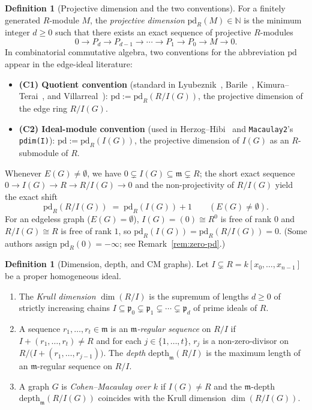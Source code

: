 \documentclass[11pt,a4paper]{amsart}
\theoremstyle{plain}
\theoremstyle{definition}
\newtheorem{definition}[theorem]{Definition}
\newcommand{\pd}{\mathrm{pd}}
\newcommand{\depth}{\mathrm{depth}}
\newcommand{\mm}{\mathfrak{m}}
\newcommand{\pp}{\mathfrak{p}}
\begin{document}
\begin{definition}[Projective dimension and the two conventions]
For a finitely generated $R$-module $M$, the \emph{projective dimension} $\pd_R(M) \in \mathbb{N}$ is the minimum integer $d \ge 0$ such that there exists an exact sequence of projective $R$-modules
\[
  0 \longrightarrow P_d \longrightarrow P_{d-1} \longrightarrow \cdots \longrightarrow P_1 \longrightarrow P_0 \longrightarrow M \longrightarrow 0.
\]
In combinatorial commutative algebra, two conventions for the abbreviation $\pd$ appear in the edge-ideal literature:
\begin{itemize}
  \item \textbf{(C1) Quotient convention} (standard in Lyubeznik~\cite{Lyubeznik1988}, Barile~\cite{Barile2008}, Kimura--Terai~\cite{KimuraTerai2009}, and Villarreal~\cite{Villarreal2015}): $\pd := \pd_R(R/I(G))$, the projective dimension of the edge ring $R/I(G)$.
  \item \textbf{(C2) Ideal-module convention} (used in Herzog--Hibi~\cite{HerzogHibi2011} and \texttt{Macaulay2}'s \texttt{pdim(I)}): $\pd := \pd_R(I(G))$, the projective dimension of $I(G)$ as an $R$-submodule of $R$.
\end{itemize}
Whenever $E(G) \neq \emptyset$, we have $0 \subsetneq I(G) \subseteq \mm \subsetneq R$; the short exact sequence $0 \to I(G) \to R \to R/I(G) \to 0$ and the non-projectivity of $R/I(G)$ yield the exact shift
\begin{equation}\label{eq:pd-shift}
  \pd_R(R/I(G)) \;=\; \pd_R(I(G)) + 1 \qquad (E(G) \neq \emptyset).
\end{equation}
For an edgeless graph ($E(G) = \emptyset$), $I(G) = (0) \cong R^0$ is free of rank $0$ and $R/I(G) \cong R$ is free of rank $1$, so $\pd_R(I(G)) = \pd_R(R/I(G)) = 0$. (Some authors assign $\pd_R(0) = -\infty$; see Remark~\ref{rem:zero-pd}.)
\end{definition}

\begin{definition}[Dimension, depth, and CM graphs]
Let $I \subsetneq R = k[x_0,\dots,x_{n-1}]$ be a proper homogeneous ideal.
\begin{enumerate}
  \item[(a)] The \emph{Krull dimension} $\dim(R/I)$ is the supremum of lengths $d \ge 0$ of strictly increasing chains $I \subseteq \pp_0 \subsetneq \pp_1 \subsetneq \cdots \subsetneq \pp_d$ of prime ideals of $R$.
  \item[(b)] A sequence $r_1, \dots, r_t \in \mm$ is an \emph{$\mm$-regular sequence} on $R/I$ if $I + (r_1,\dots,r_t) \neq R$ and for each $j \in \{1,\dots,t\}$, $r_j$ is a non-zero-divisor on $R/\bigl(I + (r_1,\dots,r_{j-1})\bigr)$. The \emph{depth} $\depth_{\mm}(R/I)$ is the maximum length of an $\mm$-regular sequence on $R/I$.
  \item[(c)] A graph $G$ is \emph{Cohen--Macaulay over $k$} if $I(G) \neq R$ and the $\mm$-depth $\depth_{\mm}(R/I(G))$ coincides with the Krull dimension $\dim(R/I(G))$.
\end{enumerate}
\end{definition}
\end{document}
